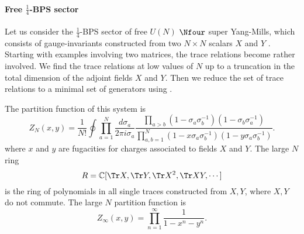 \documentclass[a4paper,12pt]{article}
\begin{document}
\paragraph{Free $\frac{1}{4}$-BPS sector}

Let us consider the $\frac{1}{4}$-BPS sector of free $U(N)$ $\Nfour$ super Yang-Mills, which consists of gauge-invariants constructed from two $N \times N$ scalars $X$ and $Y$ \cite{Dolan:2007rq}. Starting with examples involving two matrices, the trace relations become rather involved. We find the trace relations at low values of $N$ up to a truncation in the total dimension of the adjoint fields $X$ and $Y$. Then we reduce the set of trace relations to a minimal set of generators using \cite{M2}.

The partition function of this system is
\begin{equation}
Z_{N}(x,y) = \frac{1}{N!} \oint \prod_{a=1}^N \frac{d\sigma_a}{2 \pi i \sigma_a} \frac{\prod_{a>b} (1 - \sigma_a \sigma_b^{-1})(1 - \sigma_b \sigma_a^{-1})}{\prod_{a,b=1}^N (1 - x \sigma_a \sigma_b^{-1}) (1 - y \sigma_a \sigma_b^{-1})}.
\end{equation}
where $x$ and $y$ are fugacities for charges associated to fields $X$ and $Y$. The large $N$ ring
\begin{equation}
R = \mathbb{C}[\Tr X, \Tr Y, \Tr X^2, \Tr X Y, \cdots ]
\end{equation}
is the ring of polynomials in all single traces constructed from $X,Y$, where $X,Y$ do not commute. The large $N$ partition function is
\begin{equation}
Z_\infty(x,y) = \prod_{n=1}^\infty \frac{1}{1 - x^n - y^n}.
\end{equation}
\end{document}
